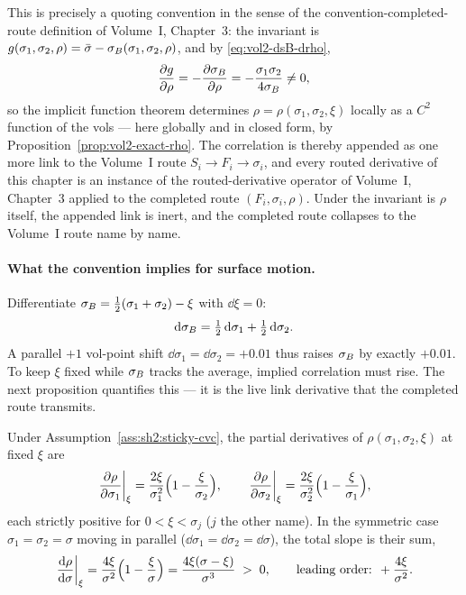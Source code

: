 \begin{remark}\label{rem:sh2:completed-route}
This is precisely a quoting convention in the sense of the
convention-completed-route definition of Volume~I, Chapter~3: the invariant
is $g(\sigma_1, \sigma_2, \rho) = \bar\sigma - \sigma_B(\sigma_1, \sigma_2, \rho)$,
and by \eqref{eq:vol2-dsB-drho},
\[
  \frac{\partial g}{\partial \rho} = -\frac{\partial \sigma_B}{\partial \rho} = -\frac{\sigma_1 \sigma_2}{4 \sigma_B} \neq 0,
\]
so the implicit function theorem determines
$\rho = \rho(\sigma_1, \sigma_2, \xi)$ locally as a $C^2$ function of the
vols --- here globally and in closed form, by
Proposition~\ref{prop:vol2-exact-rho}. The correlation is thereby appended
as one more link to the Volume~I route $S_i \to F_i \to \sigma_i$, and
every routed derivative of this chapter is an instance of the
routed-derivative operator of Volume~I, Chapter~3 applied to the completed
route $(F_i, \sigma_i, \rho)$. Under \stickyrho{} the invariant is $\rho$
itself, the appended link is inert, and the completed route collapses to
the Volume~I route name by name.
\end{remark}

\paragraph{What the convention implies for surface motion.}
Differentiate $\sigma_B = \tfrac12(\sigma_1 + \sigma_2) - \xi$ with
$\dd \xi = 0$:
\begin{equation}\label{eq:sh2:dsB}
  \mathrm{d} \sigma_B = \tfrac12\, \mathrm{d} \sigma_1 + \tfrac12\, \mathrm{d} \sigma_2 .
\end{equation}
A parallel $+1$ vol-point shift $\dd\sigma_1 = \dd\sigma_2 = +0.01$ thus
raises $\sigma_B$ by exactly $+0.01$. To keep $\xi$ fixed while $\sigma_B$ tracks the
average, implied correlation must rise. The next proposition quantifies
this --- it is the live link derivative that the completed route transmits.

\begin{proposition}\label{prop:sh2:link}
Under Assumption~\ref{ass:sh2:sticky-cvc}, the partial derivatives of
$\rho(\sigma_1, \sigma_2, \xi)$ at fixed $\xi$ are
\begin{equation}\label{eq:sh2:drho-dsigmai}
  \left.\frac{\partial \rho}{\partial \sigma_1}\right|_{\xi}
  = \frac{2\xi}{\sigma_1^2}\Bigl(1 - \frac{\xi}{\sigma_2}\Bigr),
  \qquad
  \left.\frac{\partial \rho}{\partial \sigma_2}\right|_{\xi}
  = \frac{2\xi}{\sigma_2^2}\Bigl(1 - \frac{\xi}{\sigma_1}\Bigr),
\end{equation}
each strictly positive for $0 < \xi < \sigma_j$ ($j$ the other name). In
the symmetric case $\sigma_1 = \sigma_2 = \sigma$ moving in parallel
($\dd\sigma_1 = \dd\sigma_2 = \dd\sigma$), the total slope is their sum,
\begin{equation}\label{eq:sh2:drho-dsigma}
  \left.\frac{\mathrm{d} \rho}{\mathrm{d} \sigma}\right|_{\xi}
  = \frac{4\xi}{\sigma^2}\Bigl(1 - \frac{\xi}{\sigma}\Bigr)
  = \frac{4\xi(\sigma - \xi)}{\sigma^3} \;>\; 0,
  \qquad\text{leading order: } +\frac{4\xi}{\sigma^2}.
\end{equation}
\end{proposition}

